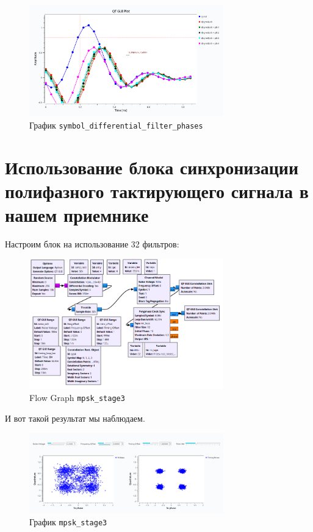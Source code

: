 \documentclass[a4paper,12pt]{report}
\begin{document}
    \begin{figure}[H]
        \centering
        \includegraphics[width=0.75\textwidth]{images/symbol_differential_filter_phases_plot.png}
        \caption{График \texttt{symbol\_differential\_filter\_phases}}
        \label{fig:symbol_differential_filter_phases_plot}
    \end{figure}
    
    \section{Использование блока синхронизации полифазного тактирующего сигнала в нашем приемнике}
    
    Настроим блок на использование 32 фильтров:
    
    \begin{figure}[H]
        \centering
        \includegraphics[width=0.75\textwidth]{images/mpsk_stage3_fg.png}
        \caption{Flow Graph \texttt{mpsk\_stage3}}
        \label{fig:mpsk_stage3_fg}
    \end{figure}
    
    И вот такой результат мы наблюдаем.
    
    \begin{figure}[H]
        \centering
        \includegraphics[width=0.75\textwidth]{images/mpsk_stage3_plot.png}
        \caption{График \texttt{mpsk\_stage3}}
        \label{fig:mpsk_stage3_plot}
    \end{figure}
    
\end{document}
